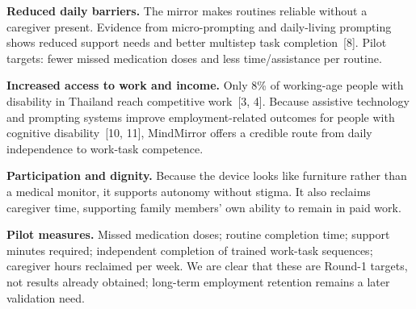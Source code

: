   \item {}

    \textbf{Reduced daily barriers.} The mirror makes routines reliable without a
    caregiver present. Evidence from micro-prompting and daily-living prompting shows
    reduced support needs and better multistep task completion~[8]. Pilot targets:
    fewer missed medication doses and less time/assistance per routine.

    \textbf{Increased access to work and income.} Only 8\% of working-age people with
    disability in Thailand reach competitive work~[3, 4]. Because assistive technology
    and prompting systems improve employment-related outcomes for people with cognitive
    disability~[10, 11], MindMirror offers a credible route from daily independence to
    work-task competence.

    \textbf{Participation and dignity.} Because the device looks like furniture rather
    than a medical monitor, it supports autonomy without stigma. It also reclaims
    caregiver time, supporting family members' own ability to remain in paid work.

    \textbf{Pilot measures.} Missed medication doses; routine completion time; support
    minutes required; independent completion of trained work-task sequences; caregiver
    hours reclaimed per week. We are clear that these are Round-1 targets, not results
    already obtained; long-term employment retention remains a later validation need.
